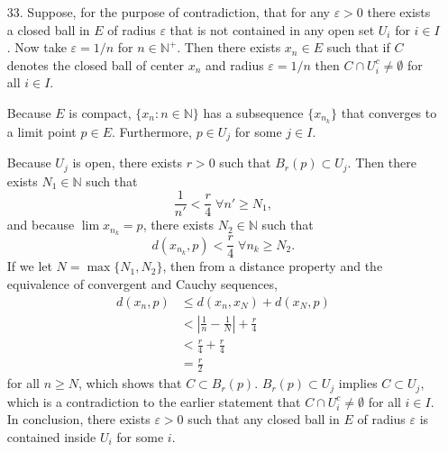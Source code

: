 \documentclass[a4paper,12pt]{article}
\begin{document}
\begin{enumerate}
        \item[33.]
            Suppose, for the purpose of contradiction, that for any $\varepsilon > 0$ there exists a closed ball in $E$ of radius $\varepsilon$ that is not contained in any open set $U_i$ for $i \in I$. Now take $\varepsilon = 1 / n$ for $n \in \mathbb{N^+}$. Then there exists $x_n \in E$ such that if $C$ denotes the closed ball of center $x_n$ and radius $\varepsilon = 1 / n$ then $C \cap U_i^c \neq \emptyset$ for all $i \in I$. \par
            Because $E$ is compact, $\{ x_n : n \in \mathbb{N} \}$ has a subsequence $\{ x_{n_k} \}$ that converges to a limit point $p \in E$. Furthermore, $p \in U_j$ for some $j \in I$. \par
            Because $U_j$ is open, there exists $r > 0$ such that $B_r(p) \subset U_j$. Then there exists $N_1 \in \mathbb{N}$ such that
            \[
                \frac{1}{n'} < \frac{r}{4} \; \forall n' \geq N_1,
            \]
            and because $\lim{x_{n_k}} = p$, there exists $N_2 \in \mathbb{N}$ such that
            \[
                d(x_{n_k}, p) < \frac{r}{4} \; \forall n_k \geq N_2.
            \]
            If we let $N = \max\{ N_1, N_2 \}$, then from a distance property and the equivalence of convergent and Cauchy sequences,
            \begin{align*}
                d(x_n, p) &\leq d(x_n, x_N) + d(x_N, p) \\
                          &< \left| \frac{1}{n} - \frac{1}{N} \right| + \frac{r}{4} \\
                          &< \frac{r}{4} + \frac{r}{4} \\
                          &= \frac{r}{2}
            \end{align*}
            for all $n \geq N$, which shows that $C \subset B_r(p)$. $B_r(p) \subset U_j$ implies $C \subset U_j$, which is a contradiction to the earlier statement that $C \cap U_i^c \neq \emptyset$ for all $i \in I$. In conclusion, there exists $\varepsilon > 0$ such that any closed ball in $E$ of radius $\varepsilon$ is contained inside $U_i$ for some $i$.


\end{enumerate}
\end{document}
